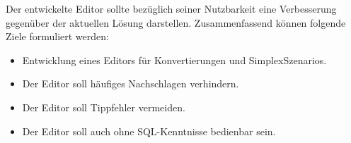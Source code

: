 \vspace{\baselineskip}

\noindent
Der entwickelte Editor sollte bezüglich seiner Nutzbarkeit eine Verbesserung gegenüber der aktuellen Lösung darstellen. Zusammenfassend können folgende Ziele formuliert werden:
\begin{itemize}
  \item Entwicklung eines Editors für Konvertierungen und SimplexSzenarios.
  \item Der Editor soll häufiges Nachschlagen verhindern.
  \item Der Editor soll Tippfehler vermeiden.
  \item Der Editor soll auch ohne \ac{SQL}-Kenntnisse bedienbar sein.
\end{itemize}
